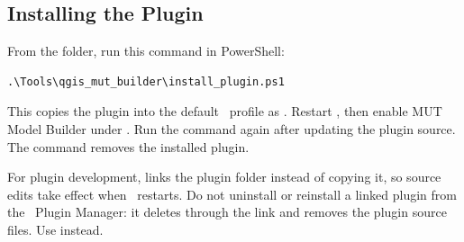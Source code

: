     \subsection{Installing the Plugin}
        From the  folder, run this command in PowerShell:
\begin{verbatim}
.\Tools\qgis_mut_builder\install_plugin.ps1
\end{verbatim}
        This copies the plugin into the default \qgis\ profile as .  Restart \qgis, then enable {\sf MUT Model Builder} under .  Run the command again after updating the plugin source.  The command  removes the installed plugin.

        For plugin development,  links the plugin folder instead of copying it, so source edits take effect when \qgis\ restarts.  Do not uninstall or reinstall a linked plugin from the \qgis\ Plugin Manager: it deletes through the link and removes the plugin source files.  Use  instead.

